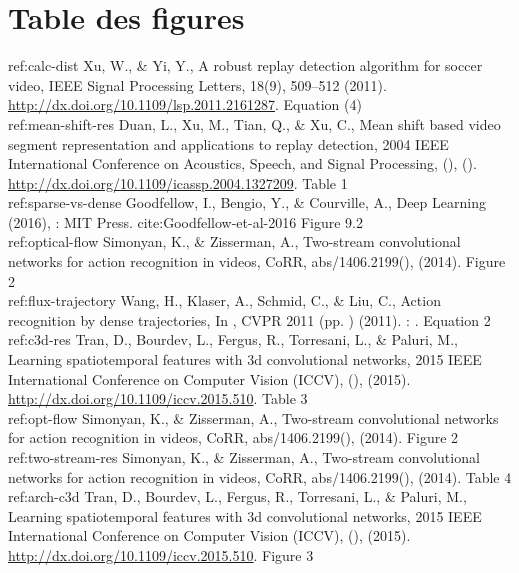 \documentclass[11pt]{article}
\begin{document}
\newpage
\section{Table des figures}
\label{sec:org69dadf9}
ref:calc-dist Xu, W., \& Yi, Y., A robust replay detection algorithm for soccer video, IEEE Signal Processing Letters, 18(9), 509–512 (2011).  \url{http://dx.doi.org/10.1109/lsp.2011.2161287}. Equation (4)\\

ref:mean-shift-res Duan, L., Xu, M., Tian, Q., \& Xu, C., Mean shift based video segment representation and applications to replay detection, 2004 IEEE International Conference on Acoustics, Speech, and Signal Processing, (),  ().  \url{http://dx.doi.org/10.1109/icassp.2004.1327209}. Table 1\\

ref:sparse-vs-dense Goodfellow, I., Bengio, Y., \& Courville, A., Deep Learning (2016), : MIT Press. cite:Goodfellow-et-al-2016 Figure 9.2\\

ref:optical-flow Simonyan, K., \& Zisserman, A., Two-stream convolutional networks for action recognition in videos, CoRR, abs/1406.2199(),  (2014). Figure 2\\

ref:flux-trajectory Wang, H., Klaser, A., Schmid, C., \& Liu, C., Action recognition by dense trajectories, In , CVPR 2011 (pp. ) (2011). : . Equation 2\\

ref:c3d-res Tran, D., Bourdev, L., Fergus, R., Torresani, L., \& Paluri, M., Learning spatiotemporal features with 3d convolutional networks, 2015 IEEE International Conference on Computer Vision (ICCV), (),  (2015).  \url{http://dx.doi.org/10.1109/iccv.2015.510}. Table 3\\

ref:opt-flow Simonyan, K., \& Zisserman, A., Two-stream convolutional networks for action recognition in videos, CoRR, abs/1406.2199(),  (2014). Figure 2\\

ref:two-stream-res Simonyan, K., \& Zisserman, A., Two-stream convolutional networks for action recognition in videos, CoRR, abs/1406.2199(),  (2014). Table 4\\

ref:arch-c3d Tran, D., Bourdev, L., Fergus, R., Torresani, L., \& Paluri, M., Learning spatiotemporal features with 3d convolutional networks, 2015 IEEE International Conference on Computer Vision (ICCV), (),  (2015).  \url{http://dx.doi.org/10.1109/iccv.2015.510}. Figure 3\\
\end{document}

